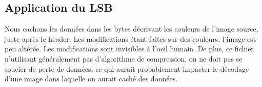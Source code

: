 \subsection{Application du LSB}
Nous cachons les données dans les bytes décrivant les couleurs de l'image source, juste après le header.
Les modifications étant faites sur des couleurs, l'image est peu altérée. Les modifications sont invisibles à l'oeil humain.
De plus, ce fichier n'utilisant généralement pas d'algorithme de compression, on ne doit pas se soucier de perte de données, 
ce qui aurait probablement impacter le décodage d'une image dans laquelle on aurait caché des données.

\vspace{1.5cm}
